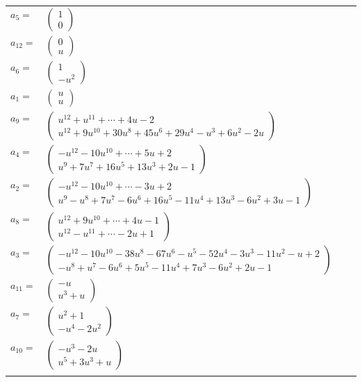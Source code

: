 \documentclass[1p]{elsarticle_modified}
\theoremstyle{definition}
\begin{document}
\begin{tabular}{m{7pt} m{180pt} m{7pt} m{180pt} }
\flushright $a_{5}=$&$\begin{pmatrix}1\\0\end{pmatrix}$ \\
\flushright $a_{12}=$&$\begin{pmatrix}0\\u\end{pmatrix}$ \\
\flushright $a_{6}=$&$\begin{pmatrix}1\\- u^2\end{pmatrix}$ \\
\flushright $a_{1}=$&$\begin{pmatrix}u\\u\end{pmatrix}$ \\
\flushright $a_{9}=$&$\begin{pmatrix}u^{12}+u^{11}+\cdots+4 u-2\\u^{12}+9 u^{10}+30 u^8+45 u^6+29 u^4- u^3+6 u^2-2 u\end{pmatrix}$ \\
\flushright $a_{4}=$&$\begin{pmatrix}- u^{12}-10 u^{10}+\cdots+5 u+2\\u^9+7 u^7+16 u^5+13 u^3+2 u-1\end{pmatrix}$ \\
\flushright $a_{2}=$&$\begin{pmatrix}- u^{12}-10 u^{10}+\cdots-3 u+2\\u^9- u^8+7 u^7-6 u^6+16 u^5-11 u^4+13 u^3-6 u^2+3 u-1\end{pmatrix}$ \\
\flushright $a_{8}=$&$\begin{pmatrix}u^{12}+9 u^{10}+\cdots+4 u-1\\u^{12}- u^{11}+\cdots-2 u+1\end{pmatrix}$ \\
\flushright $a_{3}=$&$\begin{pmatrix}- u^{12}-10 u^{10}-38 u^8-67 u^6- u^5-52 u^4-3 u^3-11 u^2- u+2\\- u^8+u^7-6 u^6+5 u^5-11 u^4+7 u^3-6 u^2+2 u-1\end{pmatrix}$ \\
\flushright $a_{11}=$&$\begin{pmatrix}- u\\u^3+u\end{pmatrix}$ \\
\flushright $a_{7}=$&$\begin{pmatrix}u^2+1\\- u^4-2 u^2\end{pmatrix}$ \\
\flushright $a_{10}=$&$\begin{pmatrix}- u^3-2 u\\u^5+3 u^3+u\end{pmatrix}$\\&\end{tabular}
\end{document}
